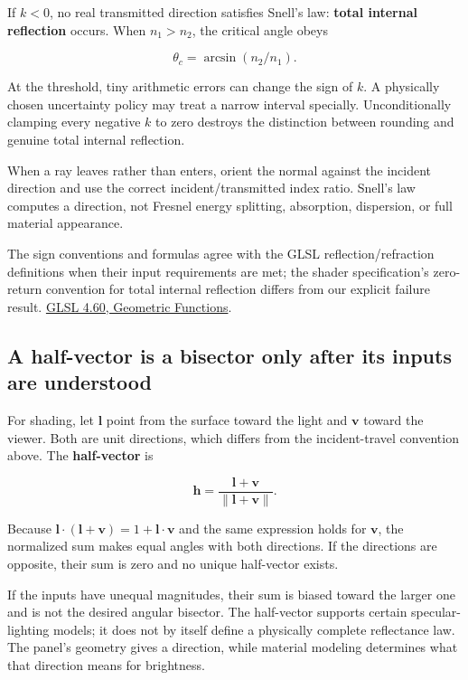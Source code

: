 If \(k<0\), no real transmitted direction satisfies Snell's law: \textbf{total internal reflection} occurs. When \(n_1>n_2\), the critical angle obeys

\[
\theta_c=\arcsin(n_2/n_1).
\]

At the threshold, tiny arithmetic errors can change the sign of \(k\). A physically chosen uncertainty policy may treat a narrow interval specially. Unconditionally clamping every negative \(k\) to zero destroys the distinction between rounding and genuine total internal reflection.

When a ray leaves rather than enters, orient the normal against the incident direction and use the correct incident/transmitted index ratio. Snell's law computes a direction, not Fresnel energy splitting, absorption, dispersion, or full material appearance.

The sign conventions and formulas agree with the GLSL reflection/refraction definitions when their input requirements are met; the shader specification's zero-return convention for total internal reflection differs from our explicit failure result. \href{https://registry.khronos.org/OpenGL/specs/gl/GLSLangSpec.4.60.html\#geometric-functions}{GLSL 4.60, Geometric Functions}.

\subsection{A half-vector is a bisector only after its inputs are understood}\label{01-foundations-i-ch018-a-half-vector-is-a-bisector-only-after-its-inputs-are-understood}

\hypertarget{01-foundations-i-ch018-a-half-vector-is-a-bisector-only-after-its-inputs-are-understood}{}

For shading, let \(\mathbf l\) point from the surface toward the light and \(\mathbf v\) toward the viewer. Both are unit directions, which differs from the incident-travel convention above. The \textbf{half-vector} is

\[
\mathbf h=\frac{\mathbf l+\mathbf v}{\|\mathbf l+\mathbf v\|}.
\]

Because \(\mathbf l\cdot(\mathbf l+\mathbf v)=1+\mathbf l\cdot\mathbf v\) and the same expression holds for \(\mathbf v\), the normalized sum makes equal angles with both directions. If the directions are opposite, their sum is zero and no unique half-vector exists.

If the inputs have unequal magnitudes, their sum is biased toward the larger one and is not the desired angular bisector. The half-vector supports certain specular-lighting models; it does not by itself define a physically complete reflectance law. The panel's geometry gives a direction, while material modeling determines what that direction means for brightness.

